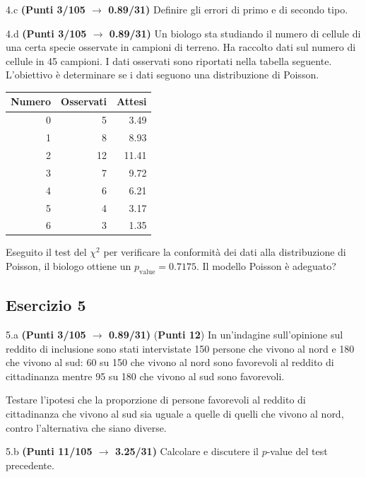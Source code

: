 \documentclass[
  11pt,
]{book}
\theoremstyle{mytheoremstyle}
\theoremstyle{mydefstyle}
\begin{document}
4.c \textbf{(Punti 3/105 \(\rightarrow\) 0.89/31)} Definire gli errori di primo e di secondo tipo.

4.d \textbf{(Punti 3/105 \(\rightarrow\) 0.89/31)} Un biologo sta studiando il numero di cellule di una certa specie osservate in campioni di terreno. Ha raccolto dati sul numero di cellule in 45 campioni. I dati osservati sono riportati nella tabella seguente. L'obiettivo è determinare se i dati seguono una distribuzione di Poisson.

\begin{table}[H]
\centering
\begin{tabular}{r|r|r}
\hline
Numero & Osservati & Attesi\\
\hline
0 & 5 & 3.49\\
\hline
1 & 8 & 8.93\\
\hline
2 & 12 & 11.41\\
\hline
3 & 7 & 9.72\\
\hline
4 & 6 & 6.21\\
\hline
5 & 4 & 3.17\\
\hline
6 & 3 & 1.35\\
\hline
\end{tabular}
\end{table}

Eseguito il test del \(\chi^2\) per verificare la conformità dei dati alla distribuzione di Poisson, il biologo ottiene un \(p_\text{value}=0.7175\). Il modello Poisson è adeguato?

\subsection{Esercizio 5}\label{esercizio-5-34}

5.a \textbf{(Punti 3/105 \(\rightarrow\) 0.89/31)} (\textbf{Punti 12}) In un'indagine sull'opinione sul reddito di inclusione sono stati intervistate 150 persone che vivono al nord e 180 che vivono al sud: 60 su 150 che vivono al nord sono favorevoli al reddito di cittadinanza mentre 95 su 180 che vivono al sud sono favorevoli.

Testare l'ipotesi che la proporzione di persone favorevoli al reddito di cittadinanza che vivono al sud sia uguale a quelle di quelli che vivono al nord, contro l'alternativa che siano diverse.

5.b \textbf{(Punti 11/105 \(\rightarrow\) 3.25/31)} Calcolare e discutere il \(p\)-value del test precedente.
\end{document}

